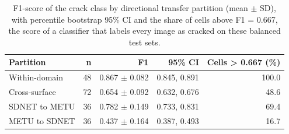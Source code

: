 \begin{table}[htbp]
\centering
\caption{F1-score of the crack class by directional transfer partition (mean $\pm$ SD), with percentile bootstrap 95\% CI and the share of cells above F1 = 0.667, the score of a classifier that labels every image as cracked on these balanced test sets.}
\label{tab:direccional-resumen}
\begin{tabular}{lrrrr}
\toprule
Partition & n & F1 & 95\% CI & Cells > 0.667 (\%) \\
\midrule
Within-domain & 48 & 0.867 $\pm$ 0.082 & 0.845, 0.891 & 100.0 \\
Cross-surface & 72 & 0.654 $\pm$ 0.092 & 0.632, 0.676 & 48.6 \\
SDNET to METU & 36 & 0.782 $\pm$ 0.149 & 0.733, 0.831 & 69.4 \\
METU to SDNET & 36 & 0.437 $\pm$ 0.164 & 0.387, 0.493 & 16.7 \\
\bottomrule
\end{tabular}
\end{table}
